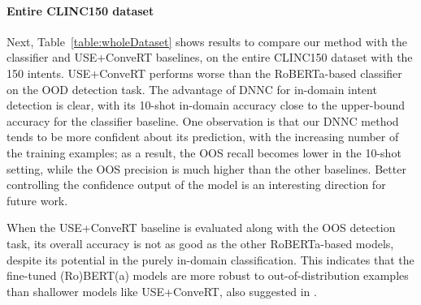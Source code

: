 \paragraph{Entire CLINC150 dataset}
Next, Table~\ref{table:wholeDataset} shows results to compare our method with the classifier and USE+ConveRT baselines, on the entire CLINC150 dataset with the 150 intents. USE+ConveRT performs worse than the RoBERTa-based classifier on the OOD detection task. 
The advantage of DNNC for in-domain intent detection is clear, with its 10-shot in-domain accuracy close to the upper-bound accuracy for the classifier baseline.
One observation is that our DNNC method tends to be more confident about its prediction, with the increasing number of the training examples; as a result, the OOS recall becomes lower in the 10-shot setting, while the OOS precision is much higher than the other baselines.
Better controlling the confidence output of the model is an interesting direction for future work.

When the USE+ConveRT baseline is evaluated along with the OOS detection task, its overall accuracy is not as good as the other RoBERTa-based models, despite its potential in the purely in-domain classification.
This indicates that the fine-tuned (Ro)BERT(a) models are more robust to out-of-distribution examples than shallower models like USE+ConveRT, also suggested in \citet{acl-ood}.

